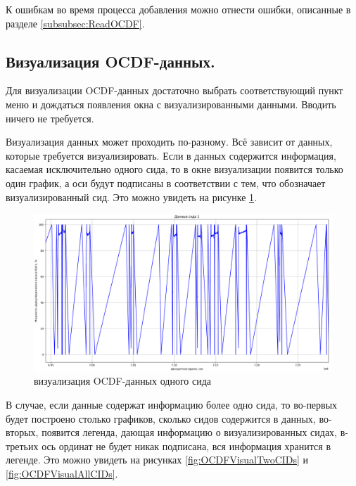 {  \par К ошибкам во время процесса добавления можно отнести ошибки, описанные в разделе \ref{subsubsec:ReadOCDF}.

  \par 
}

\subsection{ \standartTitleFont
  Визуализация OCDF-данных.
} \label{subsubsec:OCDFVisual}

{\standartFont

  \par Для визуализации OCDF-данных достаточно выбрать соответствующий пункт меню и дождаться появления окна с визуализированными данными. Вводить ничего не требуется. 

  \par Визуализация данных может проходить по-разному. Всё зависит от данных, которые требуется визуализировать. Если в данных содержится информация, касаемая исключительно одного сида, то в окне визуализации появится только один график, а оси будут подписаны в соответствии с тем, что обозначает визуализированный сид. Это можно увидеть на рисунке \ref{fig:OCDFVisualOneCID}.

  \begin{figure}[H]
    \centering
    \includegraphics[width=\textwidth]{images/forDataManipulator/OCDFVisualOneCID.png}
    \caption{визуализация OCDF-данных одного сида} 
    \label{fig:OCDFVisualOneCID}
  \end{figure}

  \par В случае, если данные содержат информацию более одно сида, то во-первых будет построено столько графиков, сколько сидов содержится в данных, во-вторых, появится легенда, дающая информацию о визуализированных сидах, в-третьих ось ординат не будет никак подписана, вся информация хранится в легенде. Это можно увидеть на рисунках \ref{fig:OCDFVisualTwoCIDs} и \ref{fig:OCDFVisualAllCIDs}.

}
